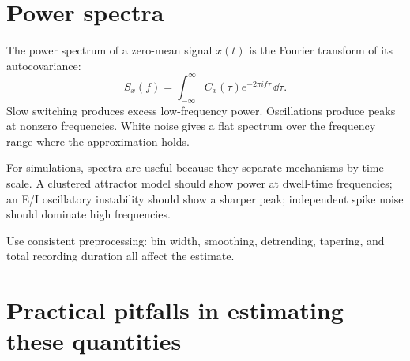 \section{Power spectra}
\label{sec:power-spectra}

The power spectrum of a zero-mean signal $x(t)$ is the Fourier transform of its autocovariance:
%
\begin{equation}
  S_x(f)=\int_{-\infty}^{\infty}
  C_x(\tau)e^{-2\pi i f\tau}\,\dd\tau.
  \label{eq:power-spectrum-definition}
\end{equation}
%
Slow switching produces excess low-frequency power. Oscillations produce peaks at nonzero frequencies. White noise gives a flat spectrum over the frequency range where the approximation holds.

For simulations, spectra are useful because they separate mechanisms by time scale. A clustered attractor model should show power at dwell-time frequencies; an E/I oscillatory instability should show a sharper peak; independent spike noise should dominate high frequencies.

Use consistent preprocessing: bin width, smoothing, detrending, tapering, and total recording duration all affect the estimate.

\section{Practical pitfalls in estimating these quantities}
\label{sec:estimation-pitfalls}

